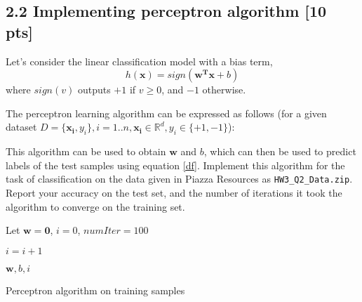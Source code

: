 \begin{soln}
\end{soln}

\newpage

\subsection*{2.2 Implementing perceptron algorithm [10 pts]}
Let's consider the linear classification model with a bias term, 
\begin{equation}
h(\mathbf{x}) = sign (\mathbf{w^T x} + b)
\label{df}
\end{equation}
where $sign(v)$ outputs $+1$ if $v \geq 0$, and $-1$ otherwise. 

The perceptron learning algorithm can be expressed as follows (for a given dataset $D = \{\mathbf{x_i}, y_i\}, i = 1..n , \mathbf{x_i} \in \mathbb{R}^d, y_i \in \{+1, -1\}$):



This algorithm can be used to obtain $\mathbf{w}$ and $b$, which can then be used to predict labels of the test samples using equation \ref{df}. Implement this algorithm for the task of classification on the data given in Piazza Resources as \texttt{HW3\_Q2\_Data.zip}. Report your accuracy on the test set, and the number of iterations it took  the algorithm to converge on the training set.

\begin{algorithm}

Let  $\mathbf{w = 0}$, $i = 0$, $numIter = 100$  \\
{
  {

	}
	$i = i + 1$ \;
	}
\Return $\mathbf{w}, b, i$
\caption{Perceptron algorithm on training samples}
\label{alg:pa1}
\end{algorithm}

\begin{soln}
\end{soln}

